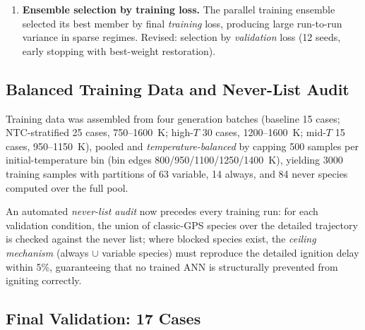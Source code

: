 \documentclass[11pt,a4paper]{article}
\begin{document}
\begin{enumerate}
    \item \textbf{Ensemble selection by training loss.} The parallel training
    ensemble selected its best member by final \emph{training} loss, producing
    large run-to-run variance in sparse regimes. Revised: selection by
    \emph{validation} loss (12 seeds, early stopping with best-weight
    restoration).
\end{enumerate}

\subsection{Balanced Training Data and Never-List Audit}

Training data was assembled from four generation batches (baseline 15 cases;
NTC-stratified 25 cases, 750--1600~K; high-$T$ 30 cases, 1200--1600~K; mid-$T$
15 cases, 950--1150~K), pooled and \emph{temperature-balanced} by capping 500
samples per initial-temperature bin (bin edges 800/950/1100/1250/1400~K),
yielding 3000 training samples with partitions of 63 variable, 14 always, and
84 never species computed over the full pool.

An automated \emph{never-list audit} now precedes every training run: for each
validation condition, the union of classic-GPS species over the detailed
trajectory is checked against the never list; where blocked species exist, the
\emph{ceiling mechanism} (always $\cup$ variable species) must reproduce the
detailed ignition delay within 5\%, guaranteeing that no trained ANN is
structurally prevented from igniting correctly.

\subsection{Final Validation: 17 Cases}
\end{document}
